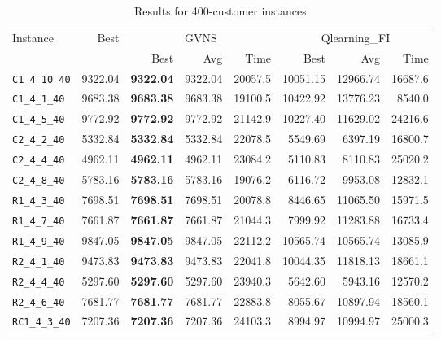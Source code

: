 \begin{table}[ht]
\centering
\small
\setlength{\tabcolsep}{5pt}
\caption{Results for 400-customer instances}
\vspace{4mm}
\begin{adjustbox}{width=\textwidth}
\begin{tabular}{l r r r r @{\hspace{8pt}} r r r @{\hspace{8pt}}}
\toprule
\multirow{2}{*}{Instance} & \multirow{2}{*}{Best} & \multicolumn{3}{c}{GVNS} & \multicolumn{3}{c}{Qlearning\_FI} \\
\cmidrule(lr){3-5} \cmidrule(lr){6-8}
 &  & Best & Avg & Time & Best & Avg & Time \\
\midrule
\texttt{C1\_4\_10\_40} & 9322.04 & \textbf{9322.04} & 9322.04 & 20057.5 & 10051.15 & 12966.74 & 16687.6 \\
\texttt{C1\_4\_1\_40} & 9683.38 & \textbf{9683.38} & 9683.38 & 19100.5 & 10422.92 & 13776.23 & 8540.0 \\
\texttt{C1\_4\_5\_40} & 9772.92 & \textbf{9772.92} & 9772.92 & 21142.9 & 10227.40 & 11629.02 & 24216.6 \\
\texttt{C2\_4\_2\_40} & 5332.84 & \textbf{5332.84} & 5332.84 & 22078.5 & 5549.69 & 6397.19 & 16800.7 \\
\texttt{C2\_4\_4\_40} & 4962.11 & \textbf{4962.11} & 4962.11 & 23084.2 & 5110.83 & 8110.83 & 25020.2 \\
\texttt{C2\_4\_8\_40} & 5783.16 & \textbf{5783.16} & 5783.16 & 19076.2 & 6116.72 & 9953.08 & 12832.1 \\
\texttt{R1\_4\_3\_40} & 7698.51 & \textbf{7698.51} & 7698.51 & 20078.8 & 8446.65 & 11065.50 & 15971.5 \\
\texttt{R1\_4\_7\_40} & 7661.87 & \textbf{7661.87} & 7661.87 & 21044.3 & 7999.92 & 11283.88 & 16733.4 \\
\texttt{R1\_4\_9\_40} & 9847.05 & \textbf{9847.05} & 9847.05 & 22112.2 & 10565.74 & 10565.74 & 13085.9 \\
\texttt{R2\_4\_1\_40} & 9473.83 & \textbf{9473.83} & 9473.83 & 22041.8 & 10044.35 & 11818.13 & 18661.1 \\
\texttt{R2\_4\_4\_40} & 5297.60 & \textbf{5297.60} & 5297.60 & 23940.3 & 5642.60 & 5943.16 & 12570.2 \\
\texttt{R2\_4\_6\_40} & 7681.77 & \textbf{7681.77} & 7681.77 & 22883.8 & 8055.67 & 10897.94 & 18560.1 \\
\texttt{RC1\_4\_3\_40} & 7207.36 & \textbf{7207.36} & 7207.36 & 24103.3 & 8994.97 & 10994.97 & 25000.3 \\

\end{tabular}
\end{adjustbox}
\end{table}
